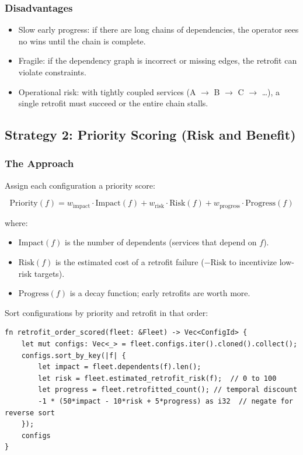 \subsubsection{Disadvantages}

\begin{itemize}
  \item Slow early progress: if there are long chains of dependencies, the operator sees no wins until the chain is complete.
  \item Fragile: if the dependency graph is incorrect or missing edges, the retrofit can violate constraints.
  \item Operational risk: with tightly coupled services (A $\to$ B $\to$ C $\to$ \ldots), a single retrofit must succeed or the entire chain stalls.
\end{itemize}

\subsection{Strategy 2: Priority Scoring (Risk and Benefit)}

\subsubsection{The Approach}

Assign each configuration a priority score:

\begin{equation}
\mathrm{Priority}(f) = w_{\mathrm{impact}} \cdot \mathrm{Impact}(f) + w_{\mathrm{risk}} \cdot \mathrm{Risk}(f) + w_{\mathrm{progress}} \cdot \mathrm{Progress}(f)
\end{equation}

where:

\begin{itemize}
  \item $\mathrm{Impact}(f)$ is the number of dependents (services that depend on $f$).
  \item $\mathrm{Risk}(f)$ is the estimated cost of a retrofit failure ($-\mathrm{Risk}$ to incentivize low-risk targets).
  \item $\mathrm{Progress}(f)$ is a decay function; early retrofits are worth more.
\end{itemize}

Sort configurations by priority and retrofit in that order:

\begin{lstlisting}[caption={Priority-driven retrofit order}]
fn retrofit_order_scored(fleet: &Fleet) -> Vec<ConfigId> {
    let mut configs: Vec<_> = fleet.configs.iter().cloned().collect();
    configs.sort_by_key(|f| {
        let impact = fleet.dependents(f).len();
        let risk = fleet.estimated_retrofit_risk(f);  // 0 to 100
        let progress = fleet.retrofitted_count(); // temporal discount
        -1 * (50*impact - 10*risk + 5*progress) as i32  // negate for reverse sort
    });
    configs
}
\end{lstlisting}

